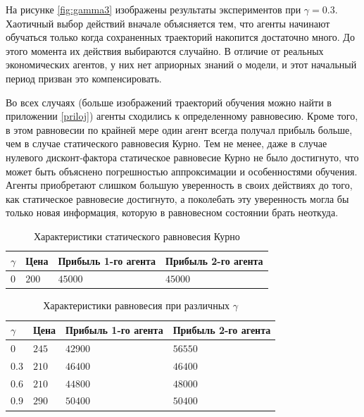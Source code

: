 \documentclass[12pt, a4paper]{extarticle}
\theoremstyle{definition}
\begin{document}
На рисунке \ref{fig:gamma3} изображены результаты экспериментов при $\gamma = 0.3$. Хаотичный выбор действий вначале объясняется тем, что агенты начинают обучаться только когда сохраненных траекторий накопится достаточно много. До этого момента их действия выбираются случайно. В отличие от реальных экономических агентов, у них нет априорных знаний о модели, и этот начальный период призван это компенсировать. 

Во всех случаях (больше изображений траекторий обучения можно найти в приложении \ref{priloj}) агенты сходились к определенному равновесию. Кроме того, в этом равновесии по крайней мере один агент всегда получал прибыль больше, чем в случае статического равновесия Курно. Тем не менее, даже в случае нулевого дисконт-фактора статическое равновесие Курно не было достигнуто, что может быть объяснено погрешностью аппроксимации и особенностями обучения. Агенты приобретают слишком большую уверенность в своих действиях до того, как статическое равновесие достигнуто, а поколебать эту уверенность могла бы только новая информация, которую в равновесном состоянии брать неоткуда.
\begin{table}[h]
\centering
\caption{Характеристики статического равновесия Курно}
\label{my-label}
\begin{tabular}{|l|l|l|l|}
\hline
$\gamma$ & Цена & Прибыль 1-го агента & Прибыль 2-го агента\\ \hline \hline
$0$ & $200$ & $45000$ & $45000$ \\ \hline
\end{tabular}
\end{table}
\begin{table}[h]
\centering
\caption{Характеристики равновесия при различных $\gamma$}
\label{my-label}
\begin{tabular}{|l|l|l|l|}
\hline
$\gamma$ & Цена & Прибыль 1-го агента & Прибыль 2-го агента\\ \hline \hline
$0$ & $245$ & $42900$ & $56550$ \\ \hline
$0.3$ & $210$ & $46400$ & $46400$ \\ \hline
$0.6$ & $210$ & $44800$ & $48000$ \\ \hline
$0.9$ & $290$ & $50400$ & $50400$ \\ \hline

\end{tabular}
\end{table}
\end{document}
